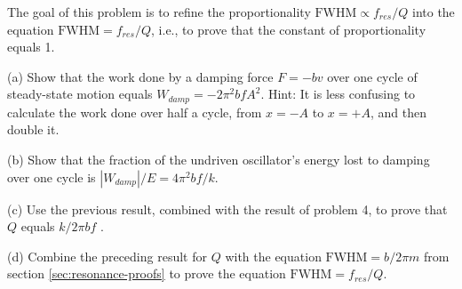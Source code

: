  The goal of this problem is to refine the proportionality
$\text{FWHM} \propto f_{res}/Q$ into the equation $\text{FWHM}=f_{res}/Q$, i.e.,
to prove that the constant of proportionality equals 1.

(a) Show that the work done by a damping force $F=-bv$
over one cycle of steady-state motion equals $W_{damp}=-2\pi ^2bfA^2$.
 Hint: It is less confusing to calculate the
work done over half a cycle, from $x=-A$ to $x=+A$, and then double it.

(b) Show that the fraction of the undriven oscillator's
energy lost to damping over one cycle is 
$|W_{damp}|/ E=4\pi ^2bf/k$.

(c) Use the previous result, combined with the result of
problem 4, to prove that $Q$ equals $k/2\pi bf$ .

(d) Combine the preceding result for $Q$ with the equation
$\text{FWHM}=b/2\pi m$ from section \ref{sec:resonance-proofs} to prove the equation $\text{FWHM}=f_{res}/Q$.

